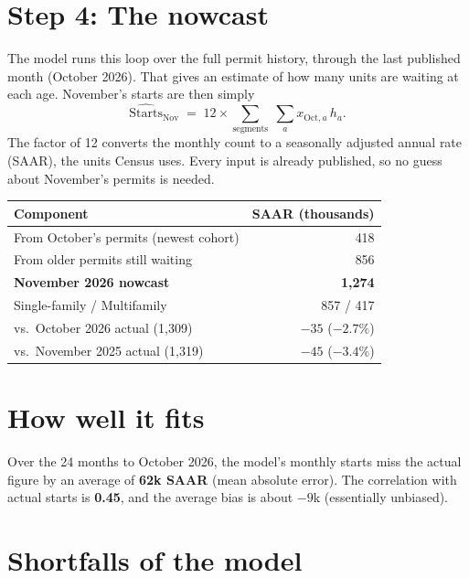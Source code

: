 \documentclass[11pt]{article}
\begin{document}
\section{Step 4: The nowcast}

The model runs this loop over the full permit history, through the last
published month (October 2026). That gives an estimate of how many units are
waiting at each age. November's starts are then simply
\[
  \widehat{\text{Starts}}_{\text{Nov}} \;=\; 12 \times \sum_{\text{segments}}\;\sum_{a} x_{\text{Oct},a}\, h_a .
\]
The factor of 12 converts the monthly count to a seasonally adjusted
annual rate (SAAR), the units Census uses. Every input is already published,
so no guess about November's permits is needed.

\begin{center}
\begin{tabular}{lr}
\toprule
Component & SAAR (thousands) \\
\midrule
From October's permits (newest cohort) & 418 \\
From older permits still waiting & 856 \\
\midrule
\textbf{November 2026 nowcast} & \textbf{1{,}274} \\
\addlinespace
\quad Single-family / Multifamily & 857 / 417 \\
\quad vs.\ October 2026 actual (1{,}309) & $-35$ \;($-2.7\%$) \\
\quad vs.\ November 2025 actual (1{,}319) & $-45$ \;($-3.4\%$) \\
\bottomrule
\end{tabular}
\end{center}

\section{How well it fits}

Over the 24 months to October 2026, the model's monthly starts miss the
actual figure by an average of \textbf{62k SAAR} (mean absolute error). The
correlation with actual starts is \textbf{0.45}, and the average bias is
about $-9$k (essentially unbiased).

\section{Shortfalls of the model}
\end{document}
